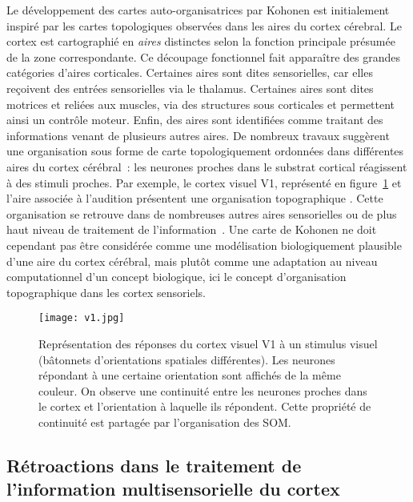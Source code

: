 \documentclass[../main]{subfiles}
\begin{document}
Le développement des cartes auto-organisatrices par Kohonen est initialement inspiré par les cartes topologiques observées dans les aires du cortex cérebral. 
Le cortex est cartographié en \emph{aires} distinctes selon la fonction principale présumée de la zone correspondante.
Ce découpage fonctionnel fait apparaître des grandes catégories d'aires corticales. 
Certaines aires sont dites sensorielles, car elles reçoivent des entrées sensorielles via le thalamus. Certaines aires sont dites motrices et reliées aux muscles, via des structures sous corticales et permettent ainsi un contrôle moteur.
Enfin, des aires sont identifiées comme traitant des informations venant de plusieurs autres aires.
De nombreux travaux suggèrent une organisation sous forme de carte topologiquement ordonnées dans différentes aires du cortex cérébral~: les neurones proches dans le substrat cortical réagissent à des stimuli proches. 
Par exemple, le cortex visuel V1, représenté en figure~\ref{fig:v1} et l'aire associée à l'audition présentent une organisation topographique \parencite{Reale1980TonotopicOI}. Cette organisation se retrouve dans de nombreuses autres aires sensorielles ou de plus haut niveau de traitement de l'information~\parencite{Kohonen1995SelfOrganizingM}. 
Une carte de Kohonen ne doit cependant pas être considérée comme une modélisation biologiquement plausible d'une aire du cortex cérébral, mais plutôt comme une adaptation au niveau computationnel d'un concept biologique, ici le concept d'organisation topographique dans les cortex sensoriels.

\begin{figure}
\centering
\texttt{[image: v1.jpg]}
\caption{Représentation des réponses du cortex visuel V1 à un stimulus visuel (bâtonnets d'orientations spatiales différentes). Les neurones répondant à une certaine orientation sont affichés de la même couleur. On observe une continuité entre les neurones proches dans le cortex et l'orientation à laquelle ils répondent. Cette propriété de continuité est partagée par l'organisation des SOM.\label{fig:v1}}
\end{figure}

\subsection{Rétroactions dans le traitement de l'information multisensorielle du cortex}
\end{document}

